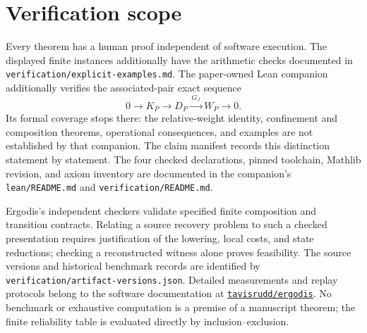 \section{Verification scope}
\label{sec:verification}

Every theorem has a human proof independent of software execution.  The
displayed finite instances additionally have the arithmetic checks documented
in \texttt{verification/explicit-examples.md}.
The paper-owned Lean companion additionally verifies the associated-pair
exact sequence
\[
 0\longrightarrow K_P\longrightarrow D_P
 \xrightarrow{\,G_J\,}W_P\longrightarrow0.
\]
Its formal coverage stops there: the relative-weight identity, confinement
and composition theorems, operational consequences, and examples are not
established by that companion.  The claim manifest records this distinction
statement by statement.  The four checked declarations, pinned toolchain,
Mathlib revision, and axiom inventory are documented in the companion's
\texttt{lean/README.md} and \texttt{verification/README.md}.

Ergodis's independent checkers validate specified finite composition and
transition contracts.  Relating a source recovery problem to such a checked
presentation requires justification of the lowering, local costs, and state
reductions; checking a reconstructed witness alone proves feasibility.
The source versions and historical benchmark records are identified by
\texttt{verification/artifact-versions.json}.  Detailed measurements and replay
protocols belong to the software documentation at
\href{https://github.com/tavisrudd/ergodis}{\texttt{tavisrudd/ergodis}}.
No benchmark or exhaustive computation is a premise of a manuscript theorem;
the finite reliability table is evaluated directly by inclusion--exclusion.
